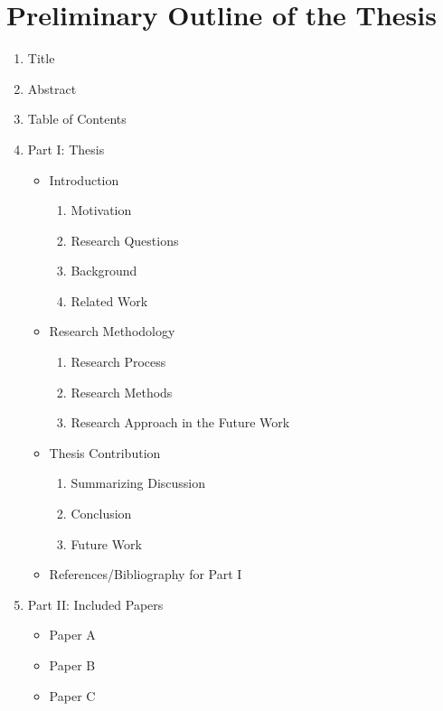 \newpage
\section{Preliminary Outline of the Thesis}
\begin{enumerate}
	\item Title
	\item Abstract
	\item Table of Contents
	\item Part I: Thesis
	\begin{itemize}
		\item Introduction
		\begin{enumerate}
			\item Motivation
			\item Research Questions
			\item Background
			\item Related Work
		\end{enumerate}
		\item Research Methodology
		\begin{enumerate}
			\item Research Process
			\item Research Methods
			\item Research Approach in the Future Work
		\end{enumerate}
		\item Thesis Contribution
		\begin{enumerate}
			\item Summarizing Discussion
			\item Conclusion
			\item Future Work
		\end{enumerate}

		\item References/Bibliography for Part I
	\end{itemize}
	\item Part II: Included Papers
	\begin{itemize}
		\item Paper A
		\item Paper B
		\item Paper C
	\end{itemize}
\end{enumerate}
